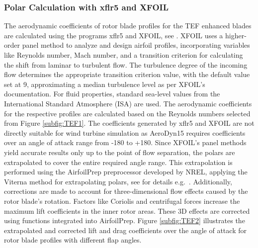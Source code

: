 \subsubsection{Polar Calculation with xflr5 and XFOIL}
The aerodynamic coefficients of rotor blade profiles for the TEF enhanced blades are calculated using the programs xflr5 and XFOIL, see \cite{drela1989xfoil}. XFOIL uses a higher-order panel method to analyze and design airfoil profiles, incorporating variables like Reynolds number, Mach number, and a transition criterion for calculating the shift from laminar to turbulent flow. The turbulence degree of the incoming flow determines the appropriate transition criterion value, with the default value set at 9, approximating a median turbulence level as per XFOIL's documentation. For fluid properties, standard sea-level values from the International Standard Atmosphere (ISA) are used. The aerodynamic coefficients for the respective profiles are calculated based on the Reynolds numbers selected from Figure \ref{subfig:TEF1}. The coefficients generated by xflr5 and XFOIL are not directly suitable for wind turbine simulation as AeroDyn15 requires coefficients over an angle of attack range from -180\textdegree{} to +180\textdegree. Since XFOIL's panel methods yield accurate results only up to the point of flow separation, the polars are extrapolated to cover the entire required angle range. This extrapolation is performed using the AirfoilPrep preprocessor developed by NREL, applying the Viterna method for extrapolating polars, see for details e.g.~\cite{gasch2011wind}. %
Additionally, corrections are made to account for three-dimensional flow effects caused by the rotor blade's rotation. Factors like Coriolis and centrifugal forces increase the maximum lift coefficients in the inner rotor areas. These 3D effects are corrected using functions integrated into AirfoilPrep. Figure \ref{subfig:TEF2} illustrates the extrapolated and corrected lift and drag coefficients over the angle of attack for rotor blade profiles with different flap angles. 

